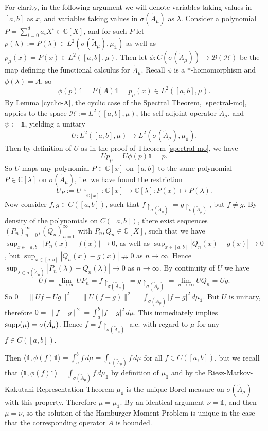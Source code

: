 \documentclass[12pt,oneside]{report}
\begin{document}
For clarity, in the following argument we will denote variables taking values in $[a,b]$ as $x$, and variables taking values in $\sigma(\tilde{A}_{\mu})$ as $\lambda$.
Consider a polynomial $P = \sum_{i=0}^{d}a_{i}X^{i} \in \mathbb{C}[X]$, and for such $P$ let $p(\lambda) := P(\lambda) \in L^{2}(\sigma(\tilde{A}_{\mu}), \mu_{\mathds{1}})$ as well as $p_{\mu}(x) = P(x) \in L^{2}([a,b],\mu)$.
Then let $\phi: C(\sigma(\tilde{A}_\mu)) \to \mathscr{B}(\mathscr{H})$ be the map defining the functional calculus for $\tilde{A}_{\mu}$. Recall $\phi$ is a $*$-homomorphism and $\phi(\lambda) = A$, so
$$\phi(p)\mathds{1} = P(A)\mathds{1} = p_{\mu}(x) \in L^{2}([a,b], \mu).$$
By Lemma \ref{cyclic-A}, the cyclic case of the Spectral Theorem, \ref{spectral-mo}, applies to the space $\mathscr{H} := L^{2}([a,b],\mu)$, the self-adjoint operator $\tilde{A}_{\mu}$, and $\psi := \mathds{1}$, yielding a unitary
$$U: L^{2}([a,b],\mu) \to L^{2}(\sigma(\tilde{A}_{\mu}),\mu_{\mathds{1}}).$$
Then by definition of $U$ as in the proof of Theorem \ref{spectral-mo}, we have
$$Up_{\mu} = U\phi(p)\mathds{1} = p.$$
So $U$ maps any polynomial $P \in \mathbb{C}[x]$ on $[a,b]$ to the same polynomial $P \in \mathbb{C}[\lambda]$ on $\sigma(\tilde{A}_{\mu})$, i.e. we have found the restriction
$$U_{P} := U \restriction_{\mathbb{C}[x]}: \mathbb{C}[x] \to \mathbb{C}[\lambda]: P(x) \mapsto P(\lambda).$$
Now consider $f,g \in C([a,b])$, such that $f \restriction_{\sigma(\tilde{A}_\mu)} = g \restriction_{\sigma(\tilde{A}_\mu)}$, but $f \neq g$. By density of the polynomials on $C([a,b])$, there exist sequences $(P_n)_{n=0}^\infty, (Q_n)_{n=0}^\infty$ with $P_n, Q_n \in \mathbb{C}[X]$, such that we have $\sup_{x \in [a,b]}|P_n(x) - f(x)| \to 0$, as well as $\sup_{x \in [a,b]}|Q_n(x) - g(x)| \to 0$, but $\sup_{x \in [a,b]}|Q_n(x) - g(x)| \nrightarrow 0$ as $n \to \infty$. Hence $\sup_{\lambda \in \sigma(\tilde{A}_\mu)}|P_n(\lambda) - Q_n(\lambda)| \to 0$ as $n \to \infty$. By continuity of $U$ we have
$$Uf = \lim_{n \to \infty} UP_n = f \restriction_{\sigma(\tilde{A}_\mu)} = g \restriction_{\sigma(\tilde{A}_\mu)} = \lim_{n \to \infty} UQ_n = Ug.$$
So $0 = \|Uf - Ug\|^2 = \|U(f-g)\|^2 = \int_{\sigma(\tilde{A}_\mu)} |f - g|^2 \, d\mu_\mathds{1}$.
But $U$ is unitary, therefore $0 = \|f-g\|^2 = \int_a^b |f - g|^2 \, d\mu$.
This immediately implies $\mathrm{supp}(\mu) = \sigma(\tilde{A}_\mu)$.
Hence $f = f \restriction_{\sigma(\tilde{A}_{\mu})}$ a.e. with regard to $\mu$ for any $f \in C([a,b])$.

Then $\langle \mathds{1}, \phi(f)\mathds{1} \rangle = \int _{a}^{b} f \, d\mu = \int _{\sigma(\tilde{A}_{\mu})} f \, d\mu$ for all $f \in C([a,b])$, but we recall that $\langle \mathds{1}, \phi(f)\mathds{1} \rangle = \int _{\sigma(\tilde{A}_{\mu})} f \, d\mu_{\mathds{1}}$ by definition of $\mu_{\mathds{1}}$ and by the Riesz-Markov-Kakutani Representation Theorem $\mu_{\mathds{1}}$ is the unique Borel measure on $\sigma(\tilde{A}_{\mu})$ with this property. Therefore $\mu = \mu_\mathds{1}$. By an identical argument $\nu = \mathds{1}$, and then $\mu = \nu$, so the solution of the Hamburger Moment Problem is unique in the case that the corresponding operator $A$ is bounded.
\end{document}
